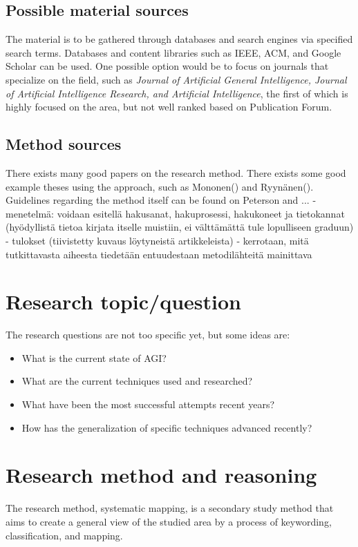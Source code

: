 \documentclass[utf8,english]{gradu3}
\begin{document}
\subsection{Possible material sources}
The material is to be gathered through databases and search engines via specified search terms. Databases and content libraries such as IEEE, ACM, and Google Scholar can be used. One possible option would be to focus on journals that specialize on the field, such as \textit{Journal of Artificial General Intelligence, Journal of Artificial Intelligence Research, and Artificial Intelligence}, the first of which is highly focused on the area, but not well ranked based on Publication Forum. 
\subsection{Method sources}

There exists many good papers on the research method. There exists some good example theses using the approach, such as Mononen() and Ryynänen(). Guidelines regarding the method itself can be found on Peterson and ...
- menetelmä: voidaan esitellä hakusanat, hakuprosessi, hakukoneet ja tietokannat (hyödyllistä tietoa kirjata itselle muistiin, ei välttämättä tule lopulliseen graduun)
- tulokset (tiivistetty kuvaus löytyneistä artikkeleista)
- kerrotaan, mitä tutkittavasta aiheesta tiedetään entuudestaan
metodilähteitä mainittava


\section{Research topic/question}
The research questions are not too specific yet, but some ideas are:
\begin{itemize}
    \item What is the current state of AGI?
    \item What are the current techniques used and researched?
    \item What have been the most successful attempts recent years?
    \item How has the generalization of specific techniques advanced recently?
\end{itemize}


\section{Research method and reasoning}
The research method, systematic mapping, is a secondary study method that aims to create a general view of the studied area by a process of keywording, classification, and mapping. 
\end{document}
